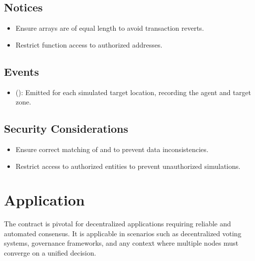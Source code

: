 \documentclass[letterpaper,10pt,english]{sphinxmanual}
\begin{document}
\subsection{Notices}
\label{\detokenize{docs_consensus_mechanism_contract:notices}}\begin{itemize}
\item {} 
\sphinxAtStartPar
{} Ensure arrays are of equal length to avoid transaction reverts.

\item {} 
\sphinxAtStartPar
{} Restrict function access to authorized addresses.

\end{itemize}


\subsection{Events}
\label{\detokenize{docs_consensus_mechanism_contract:events}}\begin{itemize}
\item {} 
\sphinxAtStartPar
{} ():
Emitted for each simulated target location, recording the agent and target zone.

\end{itemize}


\subsection{Security Considerations}
\label{\detokenize{docs_consensus_mechanism_contract:id10}}\begin{itemize}
\item {} 
\sphinxAtStartPar
{} Ensure correct matching of  and  to prevent data inconsistencies.

\item {} 
\sphinxAtStartPar
{} Restrict access to authorized entities to prevent unauthorized simulations.

\end{itemize}


\section{Application}
\label{\detokenize{docs_consensus_mechanism_contract:application}}
\sphinxAtStartPar
The  contract is pivotal for decentralized applications requiring reliable and automated consensus. It is applicable in scenarios such as decentralized voting systems, governance frameworks, and any context where multiple nodes must converge on a unified decision.
\end{document}
